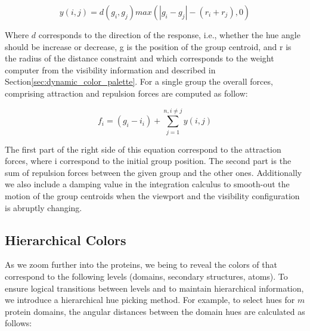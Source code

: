\documentclass[review,journal]{vgtc}         %
\begin{document}
	\begin{equation}
	y(i, j) = d(g_{i},g_{j})max(|g_{i} - g_{j}| - (r_{i}+r_{j}), 0)
	\end{equation}
	
	Where $d$ corresponds to the direction of the response, i.e., whether the hue angle should be increase or decrease, g is the position of the group centroid, and r is the radius of the distance constraint and which corresponds to the weight computer from the visibility information and described in Section\ref{sec:dynamic_color_palette}.
	For a single group the overall forces, comprising attraction and repulsion forces are computed as follow:
	
	\begin{equation}
	f_{i} = (g_{i} - i_{i}) + \sum_{j=1}^{n, i \neq j} y(i,j)
	\end{equation}
	
	The first part of the right side of this equation correspond to the attraction forces, where i correspond to the initial group position.
	The second part is the sum of repulsion forces between the given group and the other ones.
	Additionally we also include a damping value in the integration calculus to smooth-out the motion of the group centroids when the viewport and the visibility configuration is abruptly changing.
	
	\subsection{Hierarchical Colors}
	\label{sec:hierarchy}
	
	
	
	As we zoom further into the proteins, we being to reveal the colors of that correspond to the following levels (domains, secondary structures, atoms). 
	To ensure logical transitions between levels and to maintain hierarchical information, we introduce a hierarchical hue picking method. 
	For example, to select hues for $m$ protein domains, the angular distances between the domain hues are calculated as follows: 
	
\end{document}
